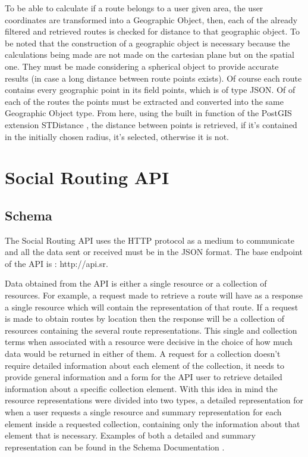     To be able to calculate if a route belongs to a user given area, the user coordinates are transformed into a Geographic Object\cite{geographicobject},
    then, each of the already filtered and retrieved routes is checked for distance to that geographic object. To be noted that the construction of a geographic
    object is necessary because the calculations being made are not made on the cartesian plane but on the spatial one. They must be made considering a spherical 
    object to provide accurate results (in case a long distance between route points exists). Of course each route contains every geographic point in its field points,
    which is of type JSON. Of of each of the routes the points must be extracted and converted into the same Geographic Object type. From here, using the built in function
    of the PostGIS extension STDistance \cite{stdistance}, the distance between points is retrieved, if it's contained in the initially 
    chosen radius, it's selected, otherwise it is not.

\newpage
\section*{Social Routing API}    
    \subsection*{Schema}
        The Social Routing API uses the HTTP protocol as a medium to 
        communicate and all the data sent or received must be in the JSON format.
        The base endpoint of the API is : http://api.sr.\par
        Data obtained from the API is either a single resource or a collection of resources. For example, a request
        made to retrieve a route will have as a response a single resource which will contain the representation of that
        route. If a request is made to obtain routes by location then the response will be a collection of resources containing
        the several route representations. This single and collection terms when associated with a
        resource were decisive in the choice of how much data would be returned in either of them. A request for a collection
        doesn't require detailed information about each element of the collection, it needs to provide general information and
        a form for the API user to retrieve detailed information about a specific collection element.
        With this idea in mind the resource representations were divided into two types, a detailed representation for when a user
        requests a single resource and summary representation for each element inside a requested collection, containing only the 
        information about that element that is necessary.
        Examples of both a detailed and summary representation can be found in the Schema Documentation \cite{schemadocs}.    
    
